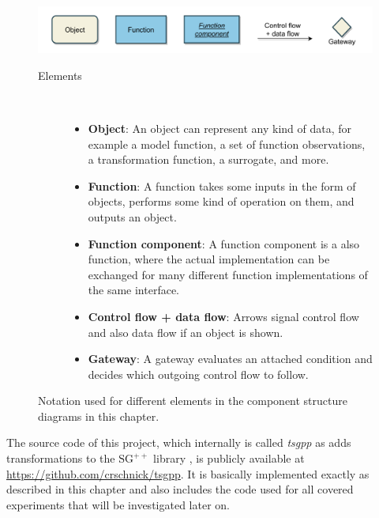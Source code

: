 \documentclass[
  a4paper,  %
  twoside,  %
  bibliography=totoc,
  headsepline,
  cleardoublepage=empty,
  parskip=half,
  draft=false
]{scrbook}
\begin{document}
\begin{mdframed}[style=style,frametitle={Notation}]
\begin{figure}[H]

\includegraphics[width=\textwidth]{graphics/definitions.pdf}
\vspace{-7.5mm}

\delimit

\vspace{3.5mm}

\begin{description}
\item[Elements] {~ \begin{itemize}[\null]
\item \textbf{Object}: An object can represent any kind of data, for example a model function, a set of function observations, a transformation function, a surrogate, and more.
\item \textbf{Function}: A function takes some inputs in the form of objects, performs some kind of operation on them, and outputs an object.
\item \textbf{Function component}: A function component is a also function, where the actual implementation can be exchanged for many different function implementations of the same interface.
\item \textbf{Control flow + data flow}: Arrows signal control flow and also data flow if an object is shown.
\item \textbf{Gateway}: A gateway evaluates an attached condition and decides which outgoing control flow to follow.
\end{itemize}}
\end{description}

\delimit

\caption{Notation used for different elements in the component structure diagrams in this chapter.}
\label{fig:defs}
\end{figure}
\end{mdframed}
%
The source code of this project, which internally is called \textit{tsgpp} as adds transformations to the $\mathrm{SG}^{++}$ library \cite{Pflueger2010}, is publicly available at \href{https://github.com/crschnick/tsgpp}{https://github.com/crschnick/tsgpp}.
It is basically implemented exactly as described in this chapter and also includes the code used for all covered experiments that will be investigated later on.
\end{document}
